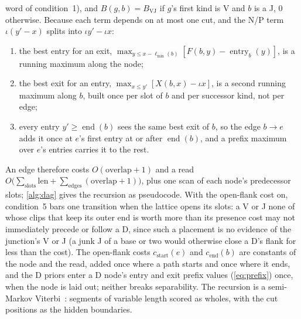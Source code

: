 \documentclass[11pt,a4paper]{article}
\begin{document}
word of condition~1), and $B(g,b)=B_{\mathrm{VJ}}$ if $g$'s first kind is V
and $b$ is a J, 0 otherwise. Because each term depends on at most one cut,
and the N/P term $\iota(y'-x)$ splits into $\iota y'-\iota x$:
\begin{enumerate}
  \item the best entry for an exit, $\max_{y\le x-\ell_{\min}(b)}[F(b,y)-\operatorname{entry}_b(y)]$,
    is a running maximum along the node;
  \item the best exit for an entry, $\max_{x\le y'}[X(b,x)-\iota x]$, is a
    second running maximum along $b$, built once per slot of $b$ and per
    successor kind, not per edge;
  \item every entry $y'\ge\operatorname{end}(b)$ sees the same best exit of
    $b$, so the edge $b\to e$ adds it once at $e$'s first entry at or after
    $\operatorname{end}(b)$, and a prefix maximum over $e$'s entries carries
    it to the rest.
\end{enumerate}
An edge therefore costs $O(\text{overlap}+1)$ and a read
$O\bigl(\sum_{\text{slots}}\text{len}+\sum_{\text{edges}}(\text{overlap}+1)\bigr)$,
plus one scan of each node's predecessor slots; \cref{alg:dag} gives the
recursion as pseudocode.
With the open-flank cost on, condition~5 bars one transition when the
lattice opens its slots: a V or J none of whose clips that keep its outer end
is worth more than its presence cost may not immediately precede or follow a
D, since such a placement is no evidence of the junction's V or J (a junk J
of a base or two would otherwise close a D's flank for less than the cost).
The open-flank costs $c_{\text{start}}(e)$ and $c_{\text{end}}(b)$ are
constants of the node and the read, added once where a path starts and once
where it ends, and the D priors enter a D node's entry and exit prefix
values (\cref{eq:prefix}) once, when the node is laid out; neither breaks
separability. The recursion is a semi-Markov Viterbi~\cite{viterbi1967,yu2010hsmm}:
segments of variable length scored as wholes, with the cut positions as the
hidden boundaries.
\end{document}
